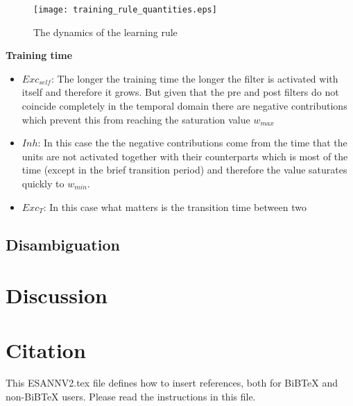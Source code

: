 \documentclass{esannV2}
\begin{document}
\begin{figure}[h!]
\centering
\texttt{[image: training\_rule\_quantities.eps]}
\caption{The dynamics of the learning rule}\label{Fig:learning_quantities}
\end{figure}

\textbf{Training time}
\begin{itemize}
\item  $Exc_{self}$: The longer the training time the longer the filter is activated with itself and therefore it grows. But given that the pre and post filters do not coincide completely in the temporal domain there are negative contributions which prevent this from reaching the saturation value $w_{max}$
\item  $Inh$: In this case the the negative contributions come from the time that the units are not activated together with their counterparts which is most of the time (except in the brief transition period) and therefore the value saturates quickly to $w_{min}$.
\item $Exc_{T}$: In this case what matters is the transition time between two 
\end{itemize} 
 
\subsection{Disambiguation}


\section{Discussion}

\section{Citation}
This ESANNV2.tex file defines how to insert references, both for
BiBTeX and non-BiBTeX users.  Please read the instructions in this
file.


\begin{footnotesize}





\end{footnotesize}

\end{document}
